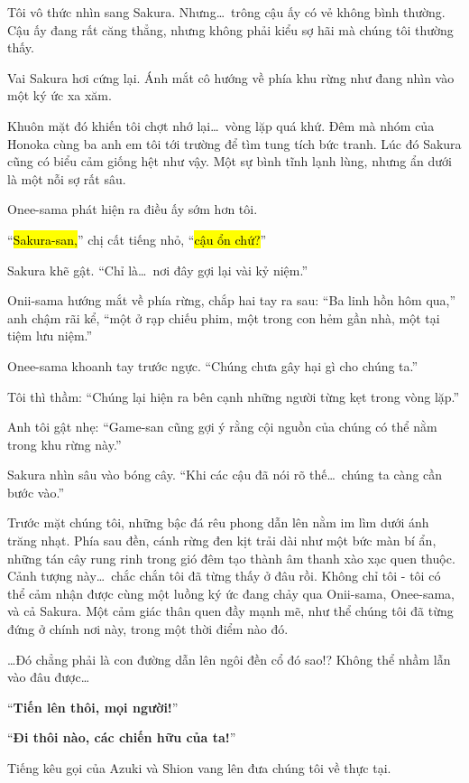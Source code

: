 \documentclass[../main.tex]{subfiles}
\begin{document}
Tôi vô thức nhìn sang Sakura. Nhưng\dots\ trông cậu ấy có vẻ không bình thường. Cậu ấy đang rất căng thẳng, nhưng không phải kiểu sợ hãi mà chúng tôi thường thấy.

Vai Sakura hơi cứng lại. Ánh mắt cô hướng về phía khu rừng như đang nhìn vào một ký ức xa xăm.

Khuôn mặt đó khiến tôi chợt nhớ lại\dots\ vòng lặp quá khứ. Đêm mà nhóm của Honoka cùng ba anh em tôi tới trường để tìm tung tích bức tranh. Lúc đó Sakura cũng có biểu cảm giống hệt như vậy. Một sự bình tĩnh lạnh lùng, nhưng ẩn dưới là một nỗi sợ rất sâu.

Onee-sama phát hiện ra điều ấy sớm hơn tôi.

``\hl{Sakura-san,}'' chị cất tiếng nhỏ, ``\hl{cậu ổn chứ?}''

Sakura khẽ gật. ``Chỉ là\dots\ nơi đây gợi lại vài kỷ niệm.''

Onii-sama hướng mắt về phía rừng, chắp hai tay ra sau: ``Ba linh hồn hôm qua,'' anh chậm rãi kể, ``một ở rạp chiếu phim, một trong con hẻm gần nhà, một tại tiệm lưu niệm.''

Onee-sama khoanh tay trước ngực. ``Chúng chưa gây hại gì cho chúng ta.''

Tôi thì thầm: ``Chúng lại hiện ra bên cạnh những người từng kẹt trong vòng lặp.''

Anh tôi gật nhẹ: ``Game-san cũng gợi ý rằng cội nguồn của chúng có thể nằm trong khu rừng này.''

Sakura nhìn sâu vào bóng cây. ``Khi các cậu đã nói rõ thế\dots\ chúng ta càng cần bước vào.''

Trước mặt chúng tôi, những bậc đá rêu phong dẫn lên nằm im lìm dưới ánh trăng nhạt. Phía sau đền, cánh rừng đen kịt trải dài như một bức màn bí ẩn, những tán cây rung rinh trong gió đêm tạo thành âm thanh xào xạc quen thuộc. Cảnh tượng này\dots\ chắc chắn tôi đã từng thấy ở đâu rồi. Không chỉ tôi - tôi có thể cảm nhận được cùng một luồng ký ức đang chảy qua Onii-sama, Onee-sama, và cả Sakura. Một cảm giác thân quen đầy mạnh mẽ, như thể chúng tôi đã từng đứng ở chính nơi này, trong một thời điểm nào đó.

\dots Đó chẳng phải là con đường dẫn lên ngôi đền cổ đó sao!? Không thể nhầm lẫn vào đâu được\dots

``\textbf{Tiến lên thôi, mọi người!}''

``\textbf{Đi thôi nào, các chiến hữu của ta!}''

Tiếng kêu gọi của Azuki và Shion vang lên đưa chúng tôi về thực tại.
\end{document}
